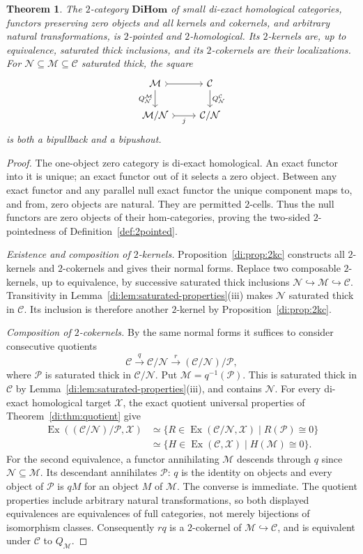 \documentclass[11pt,reqno,a4paper]{amsart}
\newtheorem{theorem}{Theorem}[section]
\theoremstyle{definition}
\theoremstyle{remark}
\newcommand{\C}{\mathcal{C}}
\newcommand{\M}{\mathcal{M}}
\newcommand{\N}{\mathcal{N}}
\newcommand{\0}{\mathbf{0}}
\renewcommand{\1}{\mathbf{1}}
\newcommand{\DiHom}{\mathbf{DiHom}}
\newcommand{\Pcal}{\mathcal P}
\newcommand{\X}{\mathcal X}
\DeclareMathOperator{\Ex}{Ex}
\begin{document}
\begin{theorem}\label{di:thm:main}
The $2$-category $\DiHom$ of small di-exact homological
categories, functors preserving zero objects and all kernels and
cokernels, and arbitrary natural transformations, is $2$-pointed
and $2$-homological. Its $2$-kernels are, up to equivalence, saturated
thick inclusions, and its $2$-cokernels are their localizations.
For $\N\subseteq\M\subseteq\C$ saturated thick, the square
\[
\begin{tikzcd}
 \M\arrow[r,tail]\arrow[d,"Q_{\N}^{\M}"']&
 \C\arrow[d,"Q_{\N}^{\C}"]\\
 \M/\N\arrow[r,tail,"j"']&\C/\N
\end{tikzcd}
\]
is both a bipullback and a bipushout.
\end{theorem}
\begin{proof}
The one-object zero category is di-exact homological. An exact
functor into it is unique; an exact functor out of it selects a zero
object. Between any exact functor and any parallel null exact
functor the unique component maps to, and from, zero objects are
natural. They are permitted $2$-cells. Thus the null functors are
zero objects of their hom-categories, proving the two-sided
$2$-pointedness of Definition~\ref{def:2pointed}.

\smallskip\noindent\emph{Existence and composition of $2$-kernels.}
Proposition~\ref{di:prop:2kc} constructs all $2$-kernels and
$2$-cokernels and gives their normal forms. Replace two composable
$2$-kernels, up to equivalence, by successive saturated thick
inclusions $\N\hookrightarrow\M\hookrightarrow\C$.
Transitivity in Lemma~\ref{di:lem:saturated-properties}(iii) makes
$\N$ saturated thick in $\C$. Its inclusion is therefore another
$2$-kernel by Proposition~\ref{di:prop:2kc}.

\smallskip\noindent\emph{Composition of $2$-cokernels.}
By the same normal forms it suffices to consider consecutive quotients
\[
 \C\xrightarrow{q}\C/\N
 \xrightarrow{r}(\C/\N)/\Pcal,
\]
where $\Pcal$ is saturated thick in $\C/\N$.
Put $\M=q^{-1}(\Pcal)$. This is saturated thick in $\C$ by
Lemma~\ref{di:lem:saturated-properties}(iii), and contains $\N$.
For every di-exact homological target $\X$, the exact quotient
universal properties of Theorem~\ref{di:thm:quotient} give
\begin{align*}
 \Ex((\C/\N)/\Pcal,\X)
 &\simeq\{R\in\Ex(\C/\N,\X)\mid R(\Pcal)\cong0\}\\
 &\simeq\{H\in\Ex(\C,\X)\mid H(\M)\cong0\}.
\end{align*}
For the second equivalence, a functor annihilating $\M$ descends
through $q$ since $\N\subseteq\M$. Its descendant annihilates
$\Pcal$: $q$ is the identity on objects and every object of
$\Pcal$ is $qM$ for an object $M$ of $\M$. The converse is
immediate. The quotient properties include arbitrary natural
transformations, so both displayed equivalences are equivalences of
full categories, not merely bijections of isomorphism classes.
Consequently $rq$ is a $2$-cokernel of $\M\hookrightarrow\C$,
and is equivalent under $\C$ to $Q_{\M}$.


\end{proof}
\end{document}
